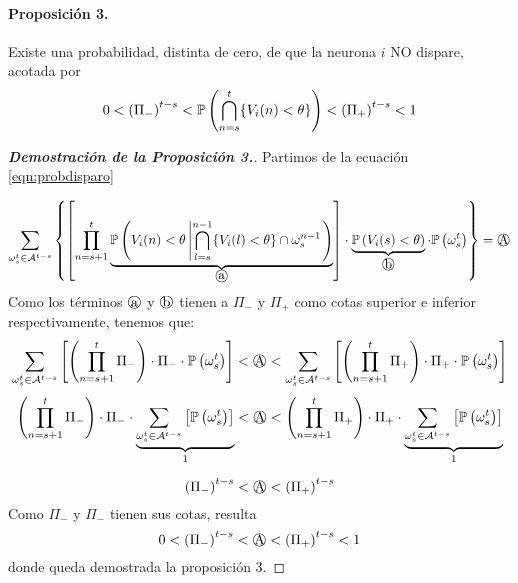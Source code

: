 \paragraph{Proposición 3.}
Existe una probabilidad, distinta de cero, de que la neurona $i$ NO dispare, acotada por
\begin{equation}
    0 < \left( \Pi_- \right)^{t-s} < \mathbb{P}\left( \bigcap_{n=s}^t \{V_i(n) < \theta \} \right)  < \left( \Pi_+ \right)^{t-s} < 1
\end{equation}

\begin{proof}[\bf{Demostración de la Proposición 3.}]
Partimos de la ecuación \eqref{eqn:probdisparo}

\begin{equation*}
    \sum_{\omega_s^t \in \mathcal{A}^{t-s}} \left\{  \left[ \prod_{n=s+1}^t
       \underbrace{ \prob{ V_i(n) < \theta \left|  \bigcap_{l=s}^{n-1} \{ V_i(l) < \theta \} \cap \omega_s^{n-1} \right.} }_{\text{\normalsize \textcircled{a}}} \right] \cdot  \underbrace{\prob{ V_i(s) < \theta}}_{\textoCircle{b}} \cdot \prob{\omega_s^t} \right\} = \textoCircle{A}
\end{equation*}
Como los términos $\textoCircle{a}$ y $\textoCircle{b}$ tienen a $\Pi_-$ y $\Pi_+$ como cotas superior e inferior respectivamente, tenemos que:
\begin{equation*}
    \sum_{\omega_s^t \in \mathcal{A}^{t-s}} \left[ \left( \prod_{n=s+1}^t
       \Pi_- \right) \cdot  \Pi_- \cdot \prob{\omega_s^t} \right]
       < \textoCircle{A} <
    \sum_{\omega_s^t \in \mathcal{A}^{t-s}} \left[ \left( \prod_{n=s+1}^t 
       \Pi_+ \right) \cdot  \Pi_+ \cdot \prob{\omega_s^t} \right]
\end{equation*}
\begin{equation*}
    \left( \prod_{n=s+1}^t \Pi_- \right) \cdot  \Pi_- \cdot \underbrace{\sum_{\omega_s^t \in \mathcal{A}^{t-s}} \left[ \prob{\omega_s^t} \right]}_{1}
       < \textoCircle{A} <
    \left( \prod_{n=s+1}^t \Pi_+ \right) \cdot  \Pi_+ \cdot \underbrace{\sum_{\omega_s^t \in \mathcal{A}^{t-s}} \left[ \prob{\omega_s^t} \right]}_{1}
\end{equation*}

\begin{equation}
    \left(\Pi_-\right)^{t-s} < \textoCircle{A} <
    \left(\Pi_+ \right)^{t-s} 
\end{equation}
Como $\Pi_-$ y $\Pi_-$ tienen sus cotas, resulta
\begin{equation}
    0<\left(\Pi_-\right)^{t-s} < \textoCircle{A} <
    \left(\Pi_+ \right)^{t-s} <1
\end{equation}
donde queda demostrada la proposición 3.
\end{proof}

